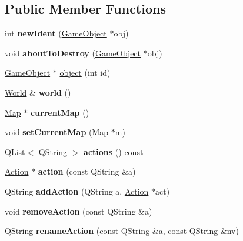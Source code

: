 \subsection*{\-Public \-Member \-Functions}
\begin{DoxyCompactItemize}
\item 
\hypertarget{class_game_ae64a3a16c7460ff0709ff5935ac0b0dd}{int {\bfseries new\-Ident} (\hyperlink{class_game_object}{\-Game\-Object} $\ast$obj)}\label{class_game_ae64a3a16c7460ff0709ff5935ac0b0dd}

\item 
\hypertarget{class_game_a944eb939fcae4546db1ef3b9bc199417}{void {\bfseries about\-To\-Destroy} (\hyperlink{class_game_object}{\-Game\-Object} $\ast$obj)}\label{class_game_a944eb939fcae4546db1ef3b9bc199417}

\item 
\hyperlink{class_game_object}{\-Game\-Object} $\ast$ \hyperlink{class_game_afc34f1c4cf865c1af7acc4b30ba44cb9}{object} (int id)
\item 
\hypertarget{class_game_a505763c778d70a1f03fbb3d231394b8a}{\hyperlink{class_world}{\-World} \& {\bfseries world} ()}\label{class_game_a505763c778d70a1f03fbb3d231394b8a}

\item 
\hypertarget{class_game_a3b242dcb7703b409692ce0c91e799a8c}{\hyperlink{class_map}{\-Map} $\ast$ {\bfseries current\-Map} ()}\label{class_game_a3b242dcb7703b409692ce0c91e799a8c}

\item 
\hypertarget{class_game_af7394ea8ff98b0b819125a6bac47db2b}{void {\bfseries set\-Current\-Map} (\hyperlink{class_map}{\-Map} $\ast$m)}\label{class_game_af7394ea8ff98b0b819125a6bac47db2b}

\item 
\hypertarget{class_game_a252b81c5e089484bf5c343719b160971}{\-Q\-List$<$ \-Q\-String $>$ {\bfseries actions} () const }\label{class_game_a252b81c5e089484bf5c343719b160971}

\item 
\hypertarget{class_game_a3a4e44e088a7154c437ff9115bda2cc4}{\hyperlink{class_action}{\-Action} $\ast$ {\bfseries action} (const \-Q\-String \&a)}\label{class_game_a3a4e44e088a7154c437ff9115bda2cc4}

\item 
\hypertarget{class_game_a924d4ba3db494d62ed6947e315e37f99}{\-Q\-String {\bfseries add\-Action} (\-Q\-String a, \hyperlink{class_action}{\-Action} $\ast$act)}\label{class_game_a924d4ba3db494d62ed6947e315e37f99}

\item 
\hypertarget{class_game_a096706d1ead39c7b8358b86e04b8eedc}{void {\bfseries remove\-Action} (const \-Q\-String \&a)}\label{class_game_a096706d1ead39c7b8358b86e04b8eedc}

\item 
\hypertarget{class_game_a70cf70c792eddfd82ddfc97a9d26ff9e}{\-Q\-String {\bfseries rename\-Action} (const \-Q\-String \&a, const \-Q\-String \&nv)}\label{class_game_a70cf70c792eddfd82ddfc97a9d26ff9e}

\end{DoxyCompactItemize}
